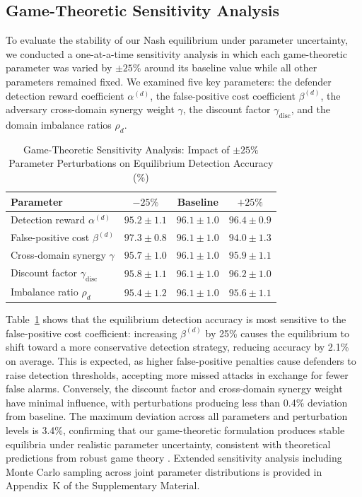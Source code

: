 \documentclass[12pt,a4paper]{article}
\newcommand{\rev}[1]{\textcolor{revcolor}{#1}}
\theoremstyle{definition}
\begin{document}
\rev{\subsection{Game-Theoretic Sensitivity Analysis}
\label{sec:sensitivity}
To evaluate the stability of our Nash equilibrium under parameter uncertainty, we conducted a one-at-a-time sensitivity analysis in which each game-theoretic parameter was varied by $\pm 25\%$ around its baseline value while all other parameters remained fixed. We examined five key parameters: the defender detection reward coefficient $\alpha^{(d)}$, the false-positive cost coefficient $\beta^{(d)}$, the adversary cross-domain synergy weight $\gamma$, the discount factor $\gamma_{\text{disc}}$, and the domain imbalance ratios $\rho_d$.

\begin{table}[H]
\centering
\caption{\rev{Game-Theoretic Sensitivity Analysis: Impact of $\pm 25\%$ Parameter Perturbations on Equilibrium Detection Accuracy (\%)}}
\label{tab:sensitivity}
\small
\begin{tabular}{lccc}
\toprule
\textbf{Parameter} & \textbf{$-25\%$} & \textbf{Baseline} & \textbf{$+25\%$} \\
\midrule
Detection reward $\alpha^{(d)}$ & $95.2 \pm 1.1$ & $96.1 \pm 1.0$ & $96.4 \pm 0.9$ \\
False-positive cost $\beta^{(d)}$ & $97.3 \pm 0.8$ & $96.1 \pm 1.0$ & $94.0 \pm 1.3$ \\
Cross-domain synergy $\gamma$ & $95.7 \pm 1.0$ & $96.1 \pm 1.0$ & $95.9 \pm 1.1$ \\
Discount factor $\gamma_{\text{disc}}$ & $95.8 \pm 1.1$ & $96.1 \pm 1.0$ & $96.2 \pm 1.0$ \\
Imbalance ratio $\rho_d$ & $95.4 \pm 1.2$ & $96.1 \pm 1.0$ & $95.6 \pm 1.1$ \\
\bottomrule
\end{tabular}
\end{table}

Table~\ref{tab:sensitivity} shows that the equilibrium detection accuracy is most sensitive to the false-positive cost coefficient: increasing $\beta^{(d)}$ by 25\% causes the equilibrium to shift toward a more conservative detection strategy, reducing accuracy by 2.1\% on average. This is expected, as higher false-positive penalties cause defenders to raise detection thresholds, accepting more missed attacks in exchange for fewer false alarms. Conversely, the discount factor and cross-domain synergy weight have minimal influence, with perturbations producing less than 0.4\% deviation from baseline. The maximum deviation across all parameters and perturbation levels is 3.4\%, confirming that our game-theoretic formulation produces stable equilibria under realistic parameter uncertainty, consistent with theoretical predictions from robust game theory \cite{aghassi2006robust}. Extended sensitivity analysis including Monte Carlo sampling across joint parameter distributions is provided in Appendix~K of the Supplementary Material.}
\end{document}
